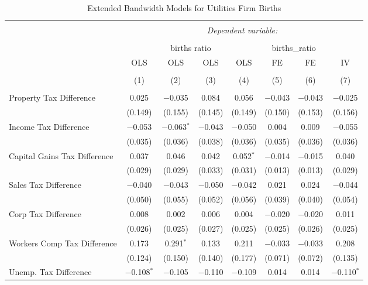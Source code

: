 
\begin{table}[!htbp] \centering 
  \caption{Extended Bandwidth Models for  Utilities Firm Births} 
  \label{} 
\begin{tabular}{@{\extracolsep{5pt}}lccccccc} 
\\[-1.8ex]\hline 
\hline \\[-1.8ex] 
 & \multicolumn{7}{c}{\textit{Dependent variable:}} \\ 
\cline{2-8} 
\\[-1.8ex] & \multicolumn{4}{c}{births ratio} & \multicolumn{2}{c}{births\_ratio} &   \\ 
 & OLS & OLS & OLS & OLS & FE & FE & IV \\ 
\\[-1.8ex] & (1) & (2) & (3) & (4) & (5) & (6) & (7)\\ 
\hline \\[-1.8ex] 
 Property Tax Difference & 0.025 & $-$0.035 & 0.084 & 0.056 & $-$0.043 & $-$0.043 & $-$0.025 \\ 
  & (0.149) & (0.155) & (0.145) & (0.149) & (0.150) & (0.153) & (0.156) \\ 
  Income Tax Difference & $-$0.053 & $-$0.063$^{*}$ & $-$0.043 & $-$0.050 & 0.004 & 0.009 & $-$0.055 \\ 
  & (0.035) & (0.036) & (0.038) & (0.036) & (0.035) & (0.036) & (0.036) \\ 
  Capital Gains Tax Difference & 0.037 & 0.046 & 0.042 & 0.052$^{*}$ & $-$0.014 & $-$0.015 & 0.040 \\ 
  & (0.029) & (0.029) & (0.033) & (0.031) & (0.013) & (0.013) & (0.029) \\ 
  Sales Tax Difference & $-$0.040 & $-$0.043 & $-$0.050 & $-$0.042 & 0.021 & 0.024 & $-$0.044 \\ 
  & (0.050) & (0.055) & (0.052) & (0.056) & (0.039) & (0.040) & (0.054) \\ 
  Corp Tax Difference & 0.008 & 0.002 & 0.006 & 0.004 & $-$0.020 & $-$0.020 & 0.011 \\ 
  & (0.026) & (0.025) & (0.027) & (0.025) & (0.025) & (0.026) & (0.025) \\ 
  Workers Comp Tax Difference & 0.173 & 0.291$^{*}$ & 0.133 & 0.211 & $-$0.033 & $-$0.033 & 0.208 \\ 
  & (0.124) & (0.150) & (0.140) & (0.177) & (0.071) & (0.072) & (0.135) \\ 
  Unemp. Tax Difference & $-$0.108$^{*}$ & $-$0.105 & $-$0.110 & $-$0.109 & 0.014 & 0.014 & $-$0.110$^{*}$ \\ 

\end{tabular}
\end{table}
